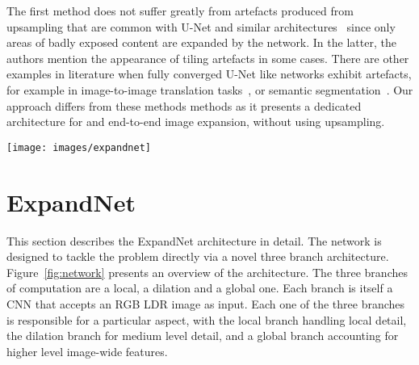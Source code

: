 \documentclass{egpubl}
\newcommand{\tc}[1]{{#1}}
\begin{document}
\tc{The first method does not suffer greatly from artefacts produced from
upsampling that are common with U-Net and similar
architectures~\cite{odena2016deconvolution} since only areas of badly exposed
content are expanded by the network. In the latter, the authors mention the
appearance of tiling artefacts in some cases. There are other examples in
literature when fully converged U-Net like networks exhibit artefacts, for
example in image-to-image translation tasks~\cite{pix2pixsuppl}, or semantic
segmentation~\cite{zhang2017suppl}. Our approach differs from these methods
methods as it presents a dedicated architecture for and end-to-end image
expansion, without using upsampling. }  
\begin{figure*}[htb]
    \centering
    \texttt{[image: images/expandnet]}
    \caption{ExpandNet architecture. The LDR input is propagated through the
    the local and dilation branches, while a resized input ($256\times256$) is
    propagated through the global branch. The output of the global branch is
    superposed over each pixel of the outputs of the other two branches. The
    resulting features are fused using $1 \times 1$ convolutions to form the
    last feature layer which then gives an RGB HDR
    prediction.}\label{fig:network}
\end{figure*}

\section{\textbf{ExpandNet}}

This section describes the ExpandNet architecture in detail. The network is
designed to tackle the problem directly via a novel three branch architecture.
Figure~\ref{fig:network} presents an overview of the architecture. The three branches of computation are a local, a dilation and a global one.
Each branch is itself a CNN that accepts an RGB LDR image as input. Each one of the
three branches is responsible for a particular aspect, with the local branch
handling local detail, the dilation branch for medium level detail, and a
global branch accounting for higher level image-wide features.
\end{document}
